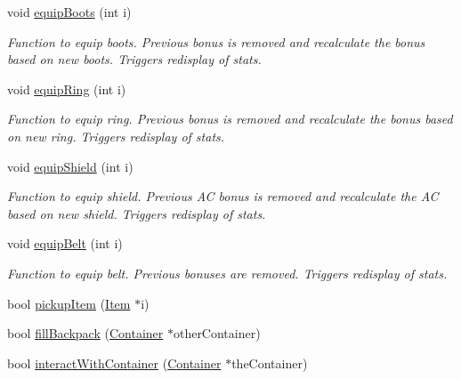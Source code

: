 \begin{DoxyCompactItemize}
\hypertarget{class_fighter_aabfc72ac049b808fabbb77aa9fdfcba4}{}\label{class_fighter_aabfc72ac049b808fabbb77aa9fdfcba4} 
void \hyperlink{class_fighter_aabfc72ac049b808fabbb77aa9fdfcba4}{equip\+Boots} (int i)
\begin{DoxyCompactList}\small\item\em Function to equip boots. Previous bonus is removed and recalculate the bonus based on new boots. Triggers redisplay of stats. \end{DoxyCompactList}\item 
\hypertarget{class_fighter_a51cff2d6b9af41b0f6a2ca3a26b6eb42}{}\label{class_fighter_a51cff2d6b9af41b0f6a2ca3a26b6eb42} 
void \hyperlink{class_fighter_a51cff2d6b9af41b0f6a2ca3a26b6eb42}{equip\+Ring} (int i)
\begin{DoxyCompactList}\small\item\em Function to equip ring. Previous bonus is removed and recalculate the bonus based on new ring. Triggers redisplay of stats. \end{DoxyCompactList}\item 
\hypertarget{class_fighter_af314de4ade8520638065735f2ebd3fc8}{}\label{class_fighter_af314de4ade8520638065735f2ebd3fc8} 
void \hyperlink{class_fighter_af314de4ade8520638065735f2ebd3fc8}{equip\+Shield} (int i)
\begin{DoxyCompactList}\small\item\em Function to equip shield. Previous AC bonus is removed and recalculate the AC based on new shield. Triggers redisplay of stats. \end{DoxyCompactList}\item 
\hypertarget{class_fighter_aed08492ff6120638f476309a50887841}{}\label{class_fighter_aed08492ff6120638f476309a50887841} 
void \hyperlink{class_fighter_aed08492ff6120638f476309a50887841}{equip\+Belt} (int i)
\begin{DoxyCompactList}\small\item\em Function to equip belt. Previous bonuses are removed. Triggers redisplay of stats. \end{DoxyCompactList}\item 
bool \hyperlink{class_fighter_a69dccfbc61abf5720e8a329203158d1e}{pickup\+Item} (\hyperlink{class_item}{Item} $\ast$i)
\item 
bool \hyperlink{class_fighter_a572fb61d329f4993701900ff3a1db5f8}{fill\+Backpack} (\hyperlink{class_container}{Container} $\ast$other\+Container)
\item 
bool \hyperlink{class_fighter_a66c0adfa4979fa3ac994359a188121a8}{interact\+With\+Container} (\hyperlink{class_container}{Container} $\ast$the\+Container)

\end{DoxyCompactItemize}
